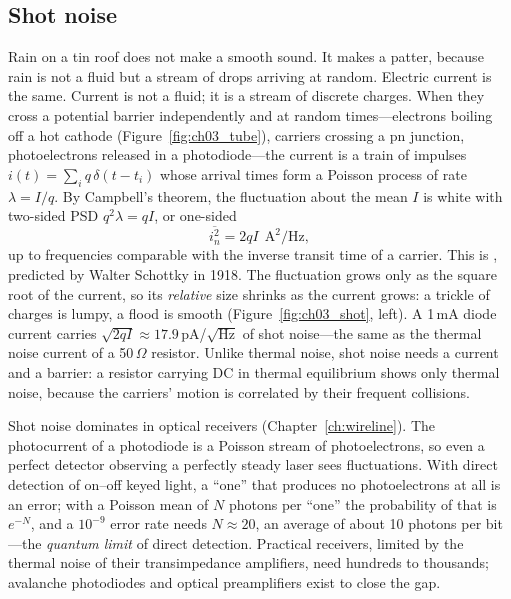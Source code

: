 
\subsection{Shot noise}

Rain on a tin roof does not make a smooth sound. It makes a patter, because rain is not a fluid but a
stream of drops arriving at random. Electric current is the same. Current is not a fluid; it is a
stream of discrete charges. When they cross a potential barrier independently and at random
times---electrons boiling off a hot cathode (Figure~\ref{fig:ch03_tube}), carriers crossing a pn
junction, photoelectrons released in a photodiode---the current is a train of impulses
$i(t)=\sum_iq\,\delta(t-t_i)$ whose arrival times form a Poisson process of rate $\lambda=I/q$. By
Campbell's theorem, the fluctuation about the mean $I$ is white with two-sided PSD $q^2\lambda=qI$, or
one-sided
\begin{equation}
\overline{i_n^2}=2qI\ \ \mathrm{A^2/Hz},
\label{eq:ch03:shot}
\end{equation}
up to frequencies comparable with the inverse transit time of a carrier. This is ,
predicted by Walter Schottky in 1918. The fluctuation grows only as the square root of the current, so
its \emph{relative} size shrinks as the current grows: a trickle of charges is lumpy, a flood is smooth
(Figure~\ref{fig:ch03_shot}, left). A 1\,mA diode current carries $\sqrt{2qI}\approx17.9$\,pA/$\sqrt{\text{Hz}}$
of shot noise---the same as the thermal noise current of a 50\,$\Omega$ resistor. Unlike thermal noise,
shot noise needs a current and a barrier: a resistor carrying DC in thermal equilibrium shows only
thermal noise, because the carriers' motion is correlated by their frequent collisions.

Shot noise dominates in optical receivers (Chapter~\ref{ch:wireline}). The photocurrent of a photodiode
is a Poisson stream of photoelectrons, so even a perfect detector observing a perfectly steady laser
sees fluctuations. With direct detection of on--off keyed light, a ``one'' that produces no
photoelectrons at all is an error; with a Poisson mean of $N$ photons per ``one'' the probability of that
is $e^{-N}$, and a $10^{-9}$ error rate needs $N\approx20$, an average of about 10 photons per bit---the
\emph{quantum limit} of direct detection. Practical receivers, limited by the thermal noise of their
transimpedance amplifiers, need hundreds to thousands; avalanche photodiodes and optical preamplifiers
exist to close the gap.

